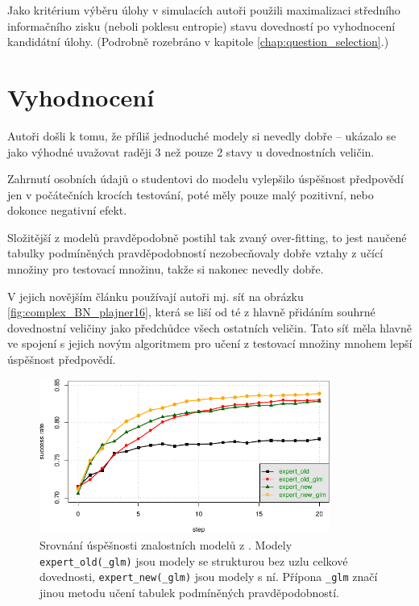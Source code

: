 \documentclass[a4paper,twoside,12pt]{book}
\begin{document}
Jako kritérium výběru úlohy v simulacích autoři použili maximalizaci středního informačního zisku (neboli poklesu entropie) stavu dovedností po vyhodnocení kandidátní úlohy. (Podrobně rozebráno v kapitole \ref{chap:question_selection}.)

\section{Vyhodnocení}
Autoři došli k tomu, že příliš jednoduché modely si nevedly dobře -- ukázalo se jako výhodné uvažovat raději 3 než pouze 2 stavy u dovednostních veličin.

Zahrnutí osobních údajů o studentovi do modelu vylepšilo úspěšnost předpovědí jen v počátečních krocích testování, poté měly pouze malý pozitivní, nebo dokonce negativní efekt.

Složitější z modelů pravděpodobně postihl tak zvaný over-fitting, to jest naučené tabulky podmíněných pravděpodobností nezobecňovaly dobře vztahy z učící množiny pro testovací množinu, takže si nakonec nevedly dobře.

V jejich novějším článku \cite{plajner16} používají autoři mj. síť na obrázku \ref{fig:complex_BN_plajner16}, která se liší od té z \cite{vomlel_plajner2015} hlavně přidáním souhrné dovednostní veličiny jako předchůdce všech ostatních veličin. Tato síť měla hlavně ve spojení s jejich novým algoritmem pro učení z testovací množiny mnohem lepší úspěšnost předpovědí.

\begin{figure}
  \centering
    \includegraphics[width=0.85\textwidth]{comparison_chart_plajner16.pdf}
  \caption{Srovnání úspěšnosti znalostních modelů z \cite{plajner16}. Modely \texttt{expert\_old(\_glm)} jsou modely se strukturou bez uzlu celkové dovednosti, \texttt{expert\_new(\_glm)} jsou modely s ní. Přípona \texttt{\_glm} značí jinou metodu učení tabulek podmíněných pravděpodobností.}
  \label{fig:comparison_chart_plajner16}
\end{figure}
\end{document}
